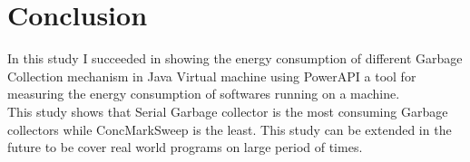 \chapter*{Conclusion}
\label{ch:Conclusion}
	\thispagestyle{conclusion}
	 
In this study I succeeded in showing the energy consumption of different Garbage Collection mechanism in Java Virtual machine using PowerAPI a tool for measuring the energy consumption of softwares running on a machine.\\ This study shows that Serial Garbage collector is the most consuming Garbage collectors while ConcMarkSweep is the least.
This study can be extended in the future to be cover real world programs on large period of times.